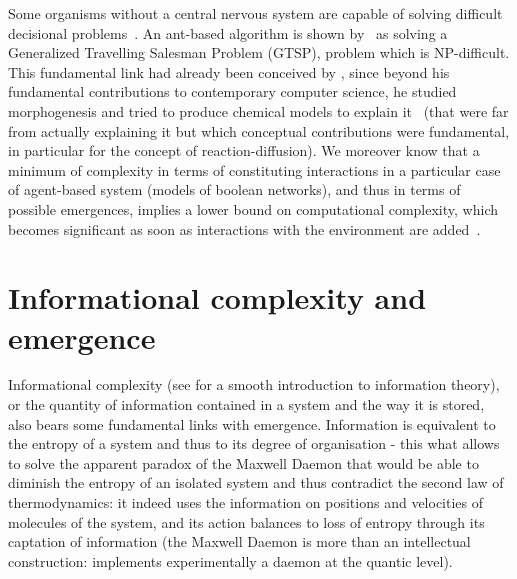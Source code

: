 Some organisms without a central nervous system are capable of solving difficult decisional problems~\cite{reid2016decision}. An ant-based algorithm is shown by~\cite{Pintea2017} as solving a Generalized Travelling Salesman Problem (GTSP), problem which is NP-difficult. This fundamental link had already been conceived by , since beyond his fundamental contributions to contemporary computer science, he studied morphogenesis and tried to produce chemical models to explain it~\cite{turing1952chemical} (that were far from actually explaining it but which conceptual contributions were fundamental, in particular for the concept of reaction-diffusion). We moreover know that a minimum of complexity in terms of constituting interactions in a particular case of agent-based system (models of boolean networks), and thus in terms of possible emergences, implies a lower bound on computational complexity, which becomes significant as soon as interactions with the environment are added~\cite{tovsic2017boolean}.








\section{Informational complexity and emergence}





Informational complexity (see \cite{dedeo2016information} for a smooth introduction to information theory), or the quantity of information contained in a system and the way it is stored, also bears some fundamental links with emergence. Information is equivalent to the entropy of a system and thus to its degree of organisation - this what allows to solve the apparent paradox of the Maxwell Daemon that would be able to diminish the entropy of an isolated system and thus contradict the second law of thermodynamics: it indeed uses the information on positions and velocities of molecules of the system, and its action balances to loss of entropy through its captation of information (the Maxwell Daemon is more than an intellectual construction: \cite{cottet2017observing} implements experimentally a daemon at the quantic level).

